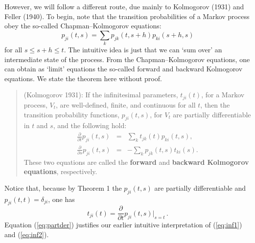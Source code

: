 \documentclass[12pt]{article}
\newcommand{\be}{\begin{equation}}
\newcommand{\ee}{\end{equation}}
\begin{document}
However, we will follow a different route, due mainly to Kolmogorov
(1931) and Feller (1940).  To begin, note that the transition
probabilities of a Markov process obey the so-called
Chapman--Kolmogorov equations:
\be
\label{eq:ChapKol}
p_{ji}(t,s) = \sum_{k} p_{jk}(t,s+h) p_{ki}(s+h,s)
\ee
for all $s \leq s+h \leq t$.  The intuitive idea is just that we can
`sum over' an intermediate state of the process.  From the
Chapman--Kolmogorov equations, one can obtain as `limit' equations the
so-called forward and backward Kolmogorov equations.  We state the
theorem here without proof.
\begin{quotation}
 (Kolmogorov 1931): If the infinitesimal
parameters, $t_{ji}(t)$, for a Markov process, $V_{t}$, are
well-defined, finite, and continuous for all $t$, then the transition
probability functions, $p_{ji}(t,s)$, for $V_{t}$ are partially
differentiable in $t$ and $s$, and the following hold:
\begin{eqnarray}
\label{eq:forKol}
\frac{\partial}{\partial t}p_{ji}(t,s)   & = &  \sum_k
t_{jk}(t)p_{ki}(t,s), \\[3ex]
\label{eq:backKol}
\frac{\partial}{\partial s}p_{ji}(t,s)  & = &  -\sum_k p_{jk}(t,s)t_{ki}(s).
\end{eqnarray}
\noindent These two equations are called the {\bf forward} and {\bf
backward Kolmogorov equations}, respectively.
\end{quotation}
\noindent Notice that, because by Theorem 1 the $p_{ji}(t,s)$ are
partially differentiable and $p_{ji}(t,t) = \delta_{ji}$, one has
\be
\label{eq:partder}
t_{ji}(t)=\frac{\partial}{\partial t}p_{ji}(t,s)\Big\vert_{s=t}\,.
\ee
Equation (\ref{eq:partder}) justifies our earlier intuitive
interpretation of (\ref{eq:inf1}) and (\ref{eq:inf2}).
\end{document}
